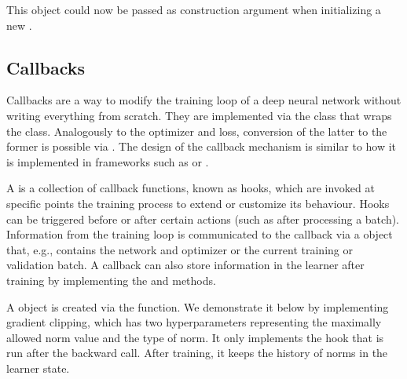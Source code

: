 \documentclass[article]{jss}
\theoremstyle{definition}
\begin{document}
This object could now be passed as construction argument  when initializing a new .

\subsection{Callbacks}\label{sec:extending-callbacks}

Callbacks are a way to modify the training loop of a deep neural network without writing everything from scratch.
They are implemented via the  class  that wraps the  class.
Analogously to the optimizer and loss, conversion of the latter to the former is possible via .
The design of the callback mechanism is similar to how it is implemented in frameworks such as \keras{} or \luz{} \citep{ref-chollet2018keras, ref-luz2023}.

A  is a collection of callback functions, known as hooks, which are invoked at specific points the training process to extend or customize its behaviour.
Hooks can be triggered before or after certain actions (such as after processing a batch).
Information from the training loop is communicated to the callback via a  object that, e.g., contains the network and optimizer or the current training or validation batch.
A callback can also store information in the learner after training by implementing the  and  methods.

A  object is created via the  function.
We demonstrate it below by implementing gradient clipping, which has two hyperparameters representing the maximally allowed norm value and the type of norm.
It only implements the hook that is run after the backward call.
After training, it keeps the history of norms in the learner state.

\end{document}
